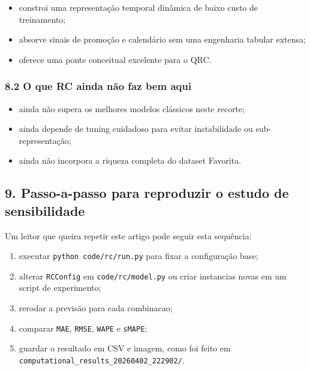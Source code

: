 \documentclass[12pt]{article}
\providecommand{\tightlist}{%
          \setlength{\itemsep}{0pt}\setlength{\parskip}{0pt}}
\begin{document}
\begin{itemize}
\tightlist
\item
  constroi uma representação temporal dinâmica de baixo custo de treinamento;
\item
  absorve sinais de promoção e calendário sem uma engenharia tabular extensa;
\item
  oferece uma ponte conceitual excelente para o QRC.
\end{itemize}

\subsubsection{8.2 O que RC ainda não faz bem aqui}\label{82-o-que-rc-ainda-nuxe3o-faz-bem-aqui}

\begin{itemize}
\tightlist
\item
  ainda não supera os melhores modelos clássicos neste recorte;
\item
  ainda depende de tuning cuidadoso para evitar instabilidade ou sub-representação;
\item
  ainda não incorpora a riqueza completa do dataset Favorita.
\end{itemize}

\subsection{9. Passo-a-passo para reproduzir o estudo de sensibilidade}\label{9-passo-a-passo-para-reproduzir-o-estudo-de-sensibilidade}

Um leitor que queira repetir este artigo pode seguir esta sequência:

\begin{enumerate}
\def\labelenumi{\arabic{enumi}.}
\tightlist
\item
  executar \texttt{python\ code/rc/run.py} para fixar a configuração base;
\item
  alterar \texttt{RCConfig} em \texttt{code/rc/model.py} ou criar instancias novas em um script de experimento;
\item
  rerodar a previsão para cada combinacao;
\item
  comparar \texttt{MAE}, \texttt{RMSE}, \texttt{WAPE} e \texttt{sMAPE};
\item
  guardar o resultado em CSV e imagem, como foi feito em \texttt{computational\_results\_20260402\_222902/}.
\end{enumerate}
\end{document}
